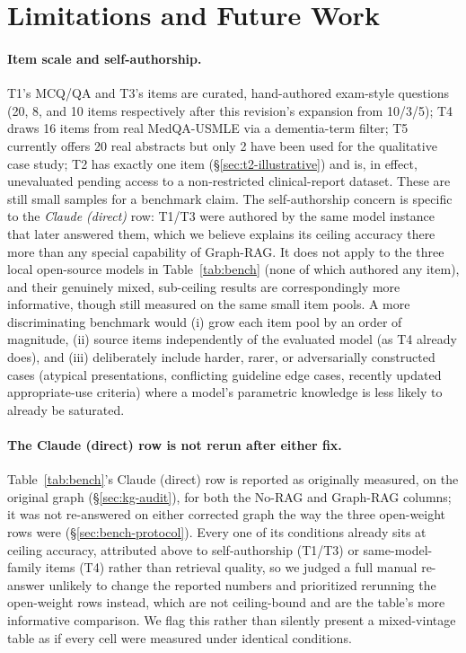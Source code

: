 \documentclass{article}
\begin{document}
\newpage
\section{Limitations and Future Work}
\label{sec:limitations}
\paragraph{Item scale and self-authorship.} T1's MCQ/QA and T3's items are curated, hand-authored exam-style questions (20, 8, and 10 items respectively after this revision's expansion from 10/3/5); T4 draws 16 items from real MedQA-USMLE via a dementia-term filter; T5 currently offers 20 real abstracts but only 2 have been used for the qualitative case study; T2 has exactly one item (\S\ref{sec:t2-illustrative}) and is, in effect, unevaluated pending access to a non-restricted clinical-report dataset. These are still small samples for a benchmark claim. The self-authorship concern is specific to the \emph{Claude (direct)} row: T1/T3 were authored by the same model instance that later answered them, which we believe explains its ceiling accuracy there more than any special capability of Graph-RAG. It does not apply to the three local open-source models in Table~\ref{tab:bench} (none of which authored any item), and their genuinely mixed, sub-ceiling results are correspondingly more informative, though still measured on the same small item pools. A more discriminating benchmark would (i) grow each item pool by an order of magnitude, (ii) source items independently of the evaluated model (as T4 already does), and (iii) deliberately include harder, rarer, or adversarially constructed cases (atypical presentations, conflicting guideline edge cases, recently updated appropriate-use criteria) where a model's parametric knowledge is less likely to already be saturated.
\paragraph{The Claude (direct) row is not rerun after either fix.} Table~\ref{tab:bench}'s Claude (direct) row is reported as originally measured, on the original graph (\S\ref{sec:kg-audit}), for both the No-RAG and Graph-RAG columns; it was not re-answered on either corrected graph the way the three open-weight rows were (\S\ref{sec:bench-protocol}). Every one of its conditions already sits at ceiling accuracy, attributed above to self-authorship (T1/T3) or same-model-family items (T4) rather than retrieval quality, so we judged a full manual re-answer unlikely to change the reported numbers and prioritized rerunning the open-weight rows instead, which are not ceiling-bound and are the table's more informative comparison. We flag this rather than silently present a mixed-vintage table as if every cell were measured under identical conditions.
\end{document}
